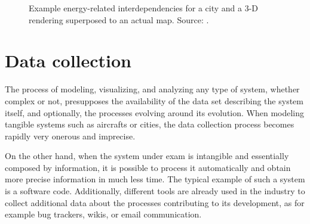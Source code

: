 \begin{figure}[!h]
\begin{adjustwidth}{0cm}{0cm}
	\hspace{1.7cm}
	\caption[Example energy-related interdependencies for a city and a 3-D rendering superposed to an actual map.]{Example energy-related interdependencies for a city and a 3-D rendering superposed to an actual map. Source: \cite{citynet}.}
	\label{fig:citynet}
\end{adjustwidth}
\end{figure}

\section{Data collection}

The process of modeling, visualizing, and analyzing any type of system, whether complex or not, presupposes the availability of the data set describing the system itself, and optionally, the processes evolving around its evolution. When modeling tangible systems such as aircrafts or cities, the data collection process becomes rapidly very onerous and imprecise.

On the other hand, when the system under exam is intangible and essentially composed by information, it is possible to process it automatically and obtain more precise information in much less time. The typical example of such a system is a software code. Additionally, different tools are already used in the industry to collect additional data about the processes contributing to its development, as for example bug trackers, wikis, or email communication.

